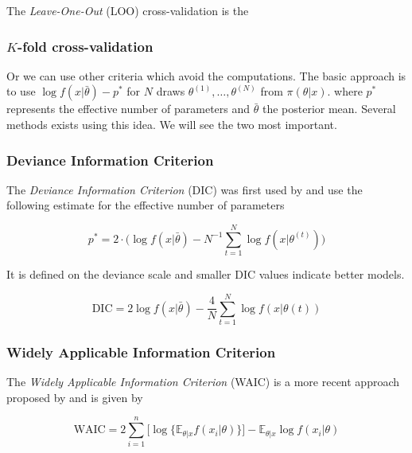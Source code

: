 The \emph{Leave-One-Out} (LOO) cross-validation is the 


\subsubsection*{$K$-fold cross-validation}

\citet{Vehtari_practical_2016}


Or we can use other criteria which avoid the computations. The basic approach is to use  $\log f(x|\bar{\theta})-p^*$ for $N$ draws $\theta^{(1)},\dots,\theta^{(N)}$ from $\pi(\theta|x)$. where $p^*$ represents the effective number of parameters and $\bar{\theta}$ the posterior mean. Several methods exists using this idea. We will see the two most important.

\subsubsection*{Deviance Information Criterion}

The \emph{Deviance Information Criterion}
(DIC) was first used by \citet{Spiegelhalter_bayesian_2002} and use the following estimate for the effective number of parameters 

\begin{equation}
p^*=2\cdot \bigg(\log f(x|\bar{\theta})-N^{-1}\sum_{t=1}^N\log f(x|\theta^{(t)})\bigg)
\end{equation}

It is defined on the deviance scale and smaller DIC values indicate better models.

\begin{equation}
\text{DIC}= 2\log f(x|\bar{\theta}) - \frac{4}{N} \sum_{t=1}^N\log f(x|\theta{(t)})
\end{equation}



\subsubsection*{Widely Applicable Information Criterion}

The \emph{Widely Applicable Information Criterion} (WAIC) is a more recent approach proposed by \citet{Watanabe_asymptotic_2010} and is given by 


\begin{equation}
\text{WAIC}= 2 \sum_{i=1}^n\big[\log\big\{\mathbb{E}_{\theta|x}f(x_i|\theta)\big\}\big]- \mathbb{E}_{\theta|x}\log f(x_i|\theta) 
\end{equation}

